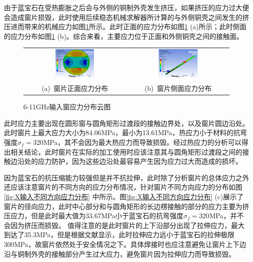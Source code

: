 \documentclass[master]{thesis-uestc}
\begin{document}
由于蓝宝石在受热膨胀之后会与外侧的铜制外壳发生挤压，如果挤压的应力过大便会造成窗片损毁，此时使用后续稳态机械求解器所计算的与外侧铜壳之间发生的挤压进而带来的机械应力如图\ref{fig:X输入应力分布}所示。此时正面的应力分布如图\ref{fig:X输入应力分布} (a)所示；此时侧面的应力分布如图\ref{fig:X输入应力分布} (b)。综合来看，主要应力位于正面和外侧铜壳之间的接触面。
\begin{figure}[!htb]
    \small
    \centering
    \begin{tabular}{@{\ }c@{\ }c}
        \includegraphics[width=0.4\textwidth]{pic/chapter3/窗片正面应力分布.png} & 
        \hspace{5pt}
        \includegraphics[width=0.4\textwidth]{pic/chapter3/窗片侧面应力分布.png}     \\
        \mbox{\small (a) 窗片正面应力分布}                                                                               & 
        \mbox{\small (b) 窗片侧面应力分布}                                                                                  \\
    \end{tabular}
    \caption{6-11GHz输入窗应力分布云图}
    \label{fig:X输入应力分布}
\end{figure}

此时应力主要出现在圆形窗与圆角矩形过渡段的接触边界处，以及窗片圆边沿处。此时窗片上最大应力大小为84.06MPa，最小为13.61MPa，热应力小于材料的抗弯强度\(\sigma_f = 320\)MPa，其不会因为最大热应力而导致损毁。经过热应力的分析可以得出相关结论，此时窗片在实际的加工使用时应该注意其与圆角矩形过渡段之间的接触边沿处的应力防护，因为这些边沿处最容易产生因为应力过大而造成的损坏。

因为蓝宝石的抗压缩能力较强但是并不抗拉伸，此时除了分析窗片的总体应力之外还应该注意窗片的不同方向的应力分布情况，针对窗片不同方向应力的分布如图\ref{fig:X输入不同方向应力分布} 中所示。图\ref{fig:X输入不同方向应力分布} (c)展示了窗片的径向应力，此时中心部分和与圆角矩形的长边楞接触的部分的应力主要为挤压应力，但是此时最大值为33.67MPa小于蓝宝石的抗弯强度\(\sigma_f=320\)MPa，并不会因为挤压而损毁。
值得注意的是此时窗片的上下沿部分出现了拉伸应力，最大到达了35.3MPa，但是根据文献\cite{schmid1998effects}显示，此时拉伸应力远小于蓝宝石的拉伸极限300MPa，故窗片依然处于安全情况之下。具体焊接时也应注意避免让窗片上下边沿与铜制外壳的接触部分产生过大应力，避免窗片因为拉伸应力而导致损毁。
\end{document}

